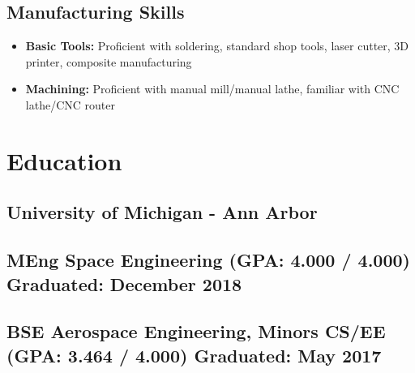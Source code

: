 \documentclass{article}
\begin{document}
\subsection{Manufacturing Skills}
\begin{itemize}
    \item \textbf{Basic Tools:} Proficient with soldering, standard shop tools, laser cutter, 3D printer, composite manufacturing
    \item \textbf{Machining:} Proficient with manual mill/manual lathe, familiar with CNC lathe/CNC router
\end{itemize}

\section{Education}
\subsection{\textbf{University of Michigan - Ann Arbor}}
\subsection{MEng Space Engineering (GPA: 4.000 / 4.000) \hfill Graduated: December 2018}
\subsection{BSE Aerospace Engineering, Minors CS/EE (GPA: 3.464 / 4.000) \hfill Graduated: May 2017}
\end{document}
